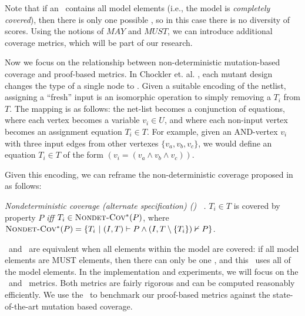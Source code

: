 \noindent Note that if an \mivc ~contains all model elements (i.e., the model is {\em completely covered}), then there is only one possible \mivc , so in this case there is no diversity of scores.
Using the notions of $MAY$ and $MUST$, we can introduce additional coverage metrics, which will be part of our research.

Now we focus on the relationship between non-deterministic mutation-based coverage and proof-based metrics. In Chockler et. al. \cite{chockler2010coverage}, each mutant design changes the type of a single node to  .
Given a suitable encoding of the netlist, assigning a ``fresh'' input is an isomorphic operation to simply removing a $T_i$ from $T$. The mapping is as follows: the net-list becomes a conjunction
of equations, where each vertex becomes a variable $v_i \in U$, and where each non-input vertex becomes an assignment equation $T_i \in T$.
For example, given an AND-vertex $v_i$ with three input edges from other vertexes $\{v_a, v_b, v_c\}$, we would define an equation $T_i \in T$ of the form $(v_i = (v_a \wedge v_b \wedge v_c))$.
%

Given this encoding, we can reframe the non-deterministic coverage proposed in \cite{chockler2010coverage} as follows:

\begin{definition} {\emph{Nondeterministic coverage (alternate specification) (\nondetcovalt) ~\cite{chockler2010coverage}.} }
\label{def:non-det-2}
$T_i \in T$ is covered by property $P$ \emph{iff} $T_i \in \text{\sc Nondet-Cov$^{*}$} (P)$, where
$\text{\sc Nondet-Cov$^{*}$} (P) = \{T_i~|~ (I, T) \vdash P \wedge (I, T \setminus \{T_i\}) \nvdash P\}$.
\end{definition}

\ivccov\ and \nondetcovalt\ are equivalent when all elements within the model are covered: if all model elements are MUST elements, then there can only be one \mivc , and this \mivc ~uses all of the model elements.   In the implementation and experiments, we will focus on the \ivccov\ and \nondetcovalt\ metrics.  Both metrics are fairly rigorous and can be computed reasonably efficiently. We use the \nondetcovalt\  to benchmark our proof-based metrics against the state-of-the-art mutation based coverage.










